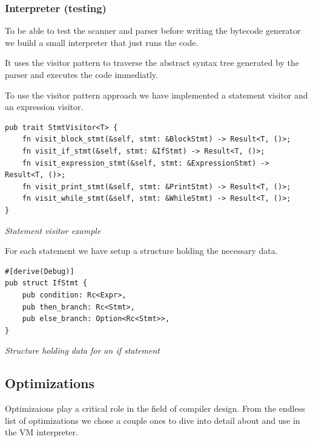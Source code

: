 \documentclass{article}
\begin{document}
\subsubsection{Interpreter (testing)}
To be able to test the scanner and parser before writing the bytecode generator
we build a small interpreter that just runs the code.

It uses the visitor pattern to traverse the abstract syntax tree generated by
the parser and executes the code immediatly.

To use the visitor pattern approach we have implemented a statement visitor and
an expression visitor.

\begin{verbatim}
pub trait StmtVisitor<T> {
    fn visit_block_stmt(&self, stmt: &BlockStmt) -> Result<T, ()>;
    fn visit_if_stmt(&self, stmt: &IfStmt) -> Result<T, ()>;
    fn visit_expression_stmt(&self, stmt: &ExpressionStmt) -> Result<T, ()>;
    fn visit_print_stmt(&self, stmt: &PrintStmt) -> Result<T, ()>;
    fn visit_while_stmt(&self, stmt: &WhileStmt) -> Result<T, ()>;
}
\end{verbatim}
\textit{Statement visitor example}

For each statement we have setup a structure holding the necessary data.

\begin{verbatim}
#[derive(Debug)]
pub struct IfStmt {
    pub condition: Rc<Expr>,
    pub then_branch: Rc<Stmt>,
    pub else_branch: Option<Rc<Stmt>>,
}
\end{verbatim}
\textit{Structure holding data for an if statement}


\subsection{Optimizations}
Optimizaions play a critical role in the field of compiler design. From the
endless list of optimizations we chose a couple ones to dive into detail
about and use in the VM interpreter.
\end{document}
